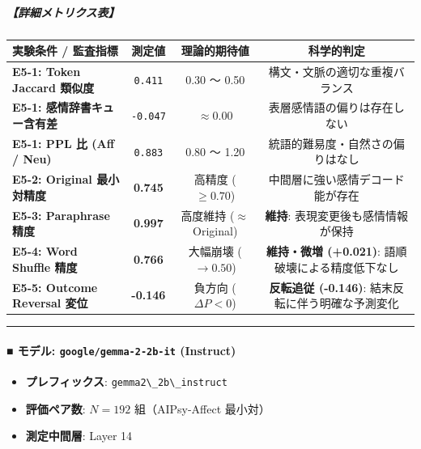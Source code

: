 \subparagraph{【詳細メトリクス表】}
\begin{center}
\small
\begin{tabular}{lccc}
\toprule
\textbf{実験条件 / 監査指標} & \textbf{測定値} & \textbf{理論的期待値} & \textbf{科学的判定} \\
\midrule
\textbf{E5-1: Token Jaccard 類似度} & \texttt{0.411} & 0.30 〜 0.50 & 構文・文脈の適切な重複バランス \\
\textbf{E5-1: 感情辞書キュー含有差} & \texttt{-0.047} & $\approx 0.00$ & 表層感情語の偏りは存在しない \\
\textbf{E5-1: PPL 比 (Aff / Neu)} & \texttt{0.883} & 0.80 〜 1.20 & 統語的難易度・自然さの偏りはなし \\
\textbf{E5-2: Original 最小対精度} & \textbf{0.745} & 高精度 ($\ge 0.70$) & 中間層に強い感情デコード能が存在 \\
\textbf{E5-3: Paraphrase 精度} & \textbf{0.997} & 高度維持 ($\approx$ Original) & \textbf{維持}: 表現変更後も感情情報が保持 \\
\textbf{E5-4: Word Shuffle 精度} & \textbf{0.766} & 大幅崩壊 ($\rightarrow 0.50$) & \textbf{維持・微増 (+0.021)}: 語順破壊による精度低下なし \\
\textbf{E5-5: Outcome Reversal 変位} & \textbf{-0.146} & 負方向 ($\Delta P < 0$) & \textbf{反転追従 (-0.146)}: 結末反転に伴う明確な予測変化 \\
\bottomrule
\end{tabular}
\end{center}


\vspace{0.5em}\hrule\vspace{0.5em}

\paragraph{■ モデル: \texttt{google/gemma-2-2b-it} (Instruct)}
\begin{itemize}
\item \textbf{プレフィックス}: \texttt{gemma2\textbackslash{}\_2b\textbackslash{}\_instruct}
\item \textbf{評価ペア数}: $N=192$ 組（AIPsy-Affect 最小対）
\item \textbf{測定中間層}: Layer 14
\end{itemize}

